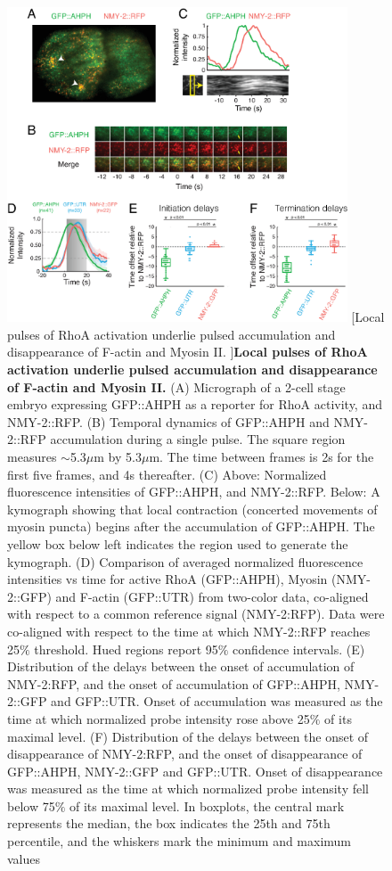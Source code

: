 \documentclass{ucetd}
\begin{document}
\begin{figure}[!htbp]
\centering
\includegraphics[width=0.9\textwidth]{Figure2-4}
[Local pulses of RhoA activation underlie pulsed accumulation and disappearance of F-actin and Myosin II.
]{\textbf{Local pulses of RhoA activation underlie pulsed accumulation and disappearance of F-actin and Myosin II.} (A) Micrograph of a 2-cell stage embryo expressing GFP::AHPH as a reporter for RhoA activity, and NMY-2::RFP. (B) Temporal dynamics of GFP::AHPH and NMY-2::RFP accumulation during a single pulse. The square region measures $\sim$5.3$\mu$m by 5.3$\mu$m. The time between frames is 2s for the first five frames, and 4s thereafter. (C) Above: Normalized fluorescence intensities of GFP::AHPH, and NMY-2::RFP. Below: A kymograph showing that local contraction (concerted movements of myosin puncta) begins after the accumulation of GFP::AHPH. The yellow box below left indicates the region used to generate the kymograph. (D) Comparison of averaged normalized fluorescence intensities vs time for active RhoA (GFP::AHPH), Myosin (NMY-2::GFP) and F-actin (GFP::UTR) from two-color data, co-aligned with respect to a common reference signal (NMY-2:RFP). Data were co-aligned with respect to the time at which NMY-2::RFP reaches 25$\%$ threshold. Hued regions report 95$\%$ confidence intervals. (E) Distribution of the delays between the onset of accumulation of NMY-2:RFP, and the onset of accumulation of GFP::AHPH, NMY-2::GFP and GFP::UTR. Onset of accumulation was measured as the time at which normalized probe intensity rose above 25$\%$ of its maximal level. (F) Distribution of the delays between the onset of disappearance of NMY-2:RFP, and the onset of disappearance of GFP::AHPH, NMY-2::GFP and GFP::UTR. Onset of disappearance was measured as the time at which normalized probe intensity fell below 75$\%$ of its maximal level. In boxplots, the central mark represents the median, the box indicates the 25th and 75th percentile, and the whiskers mark the minimum and maximum values}\end{figure}
\end{document}
